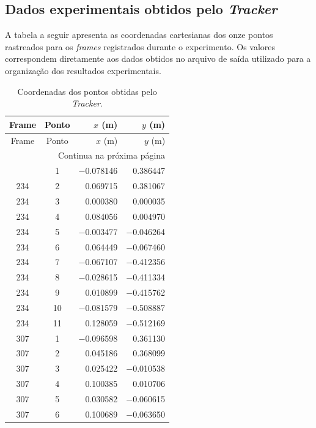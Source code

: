 \documentclass[12pt,a4paper,twoside]{article}
\numberwithin{equation}{section}
\begin{document}
\subsection{Dados experimentais obtidos pelo \emph{Tracker}}

A tabela a seguir apresenta as coordenadas cartesianas dos onze pontos rastreados para os
\emph{frames} registrados durante o experimento. Os valores correspondem diretamente aos
dados obtidos no arquivo de saída utilizado para a organização dos resultados
experimentais.

{\small
\begin{longtable}{cc rr}
  \caption{Coordenadas dos pontos obtidas pelo \emph{Tracker}.}\label{tab:tracker}\\
  \toprule
  Frame & Ponto & $x$ (m) & $y$ (m) \\
  \midrule
  \endfirsthead
  \toprule
  Frame & Ponto & $x$ (m) & $y$ (m) \\
  \midrule
  \endhead
  \midrule
  \multicolumn{4}{r}{Continua na próxima página}\\
  \endfoot
  \bottomrule
  \endlastfoot
    234 & 1 & \ensuremath{-}0.078146 & 0.386447 \\
    234 & 2 & 0.069715 & 0.381067 \\
    234 & 3 & 0.000380 & 0.000035 \\
    234 & 4 & 0.084056 & 0.004970 \\
    234 & 5 & \ensuremath{-}0.003477 & \ensuremath{-}0.046264 \\
    234 & 6 & 0.064449 & \ensuremath{-}0.067460 \\
    234 & 7 & \ensuremath{-}0.067107 & \ensuremath{-}0.412356 \\
    234 & 8 & \ensuremath{-}0.028615 & \ensuremath{-}0.411334 \\
    234 & 9 & 0.010899 & \ensuremath{-}0.415762 \\
    234 & 10 & \ensuremath{-}0.081579 & \ensuremath{-}0.508887 \\
    234 & 11 & 0.128059 & \ensuremath{-}0.512169 \\
    307 & 1 & \ensuremath{-}0.096598 & 0.361130 \\
    307 & 2 & 0.045186 & 0.368099 \\
    307 & 3 & 0.025422 & \ensuremath{-}0.010538 \\
    307 & 4 & 0.100385 & 0.010706 \\
    307 & 5 & 0.030582 & \ensuremath{-}0.060615 \\
    307 & 6 & 0.100689 & \ensuremath{-}0.063650 \\

\end{longtable}}
\end{document}
